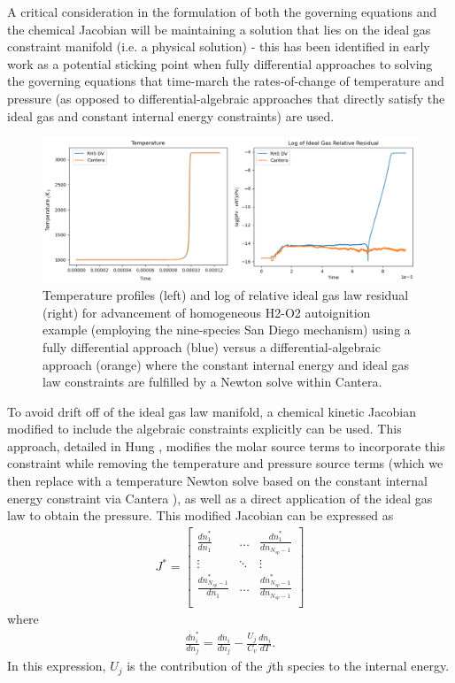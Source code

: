 A critical consideration in the formulation of both the governing equations
and the chemical Jacobian will be maintaining a solution
that lies on the ideal gas constraint manifold (i.e. a physical solution) - this
has been identified in early work as a potential sticking point when fully
differential approaches to solving the governing equations that time-march
the rates-of-change of temperature and pressure (as opposed to
differential-algebraic approaches that directly satisfy the ideal gas and
constant internal energy constraints) are used.
\begin{figure}
\centering
\includegraphics[width=0.8\linewidth,trim=4 4 4 4,clip]{figures/autoignition_drift.png}
	\caption{Temperature profiles (left) and log of relative ideal gas law residual (right)
		 for advancement of homogeneous H2-O2 autoignition example (employing the nine-species
		 San Diego mechanism) using a fully differential approach (blue) versus a differential-algebraic
		 approach (orange) where the constant internal energy and ideal gas law constraints are fulfilled
		 by a Newton solve within Cantera.}
\label{fig:autoignition_drift}
\end{figure}
To avoid drift off of the ideal gas law manifold, a chemical
kinetic Jacobian modified to include the algebraic constraints explicitly can
be used. This approach, detailed in Hung \cite{hung2003algorithms}, modifies the molar source terms to incorporate
this constraint while removing the temperature and pressure source terms (which
we then replace with a temperature Newton solve based on the constant internal
energy constraint via Cantera \cite{cantera}), as well as a direct application of the ideal
gas law to obtain the pressure. This modified Jacobian can be expressed as
\begin{align}
J^{*} = \begin{bmatrix}	\frac{d\dot{n}_{1}^{*}}{dn_{1}} & \hdots & \frac{d\dot{n}_{1}^{*}}{dn_{N_{sp}-1}} \\
	                \vdots & \ddots & \vdots \\
	                \frac{d\dot{n}_{N_{sp}-1}^{*}}{dn_{1}} & \hdots & \frac{d\dot{n}_{N_{sp}-1}^{*}}{dn_{N_{sp}-1}} \\
    \end{bmatrix}
\end{align}
where
\begin{align}
\frac{d\dot{n}_{i}^{*}}{dn_{j}} = \frac{d\dot{n}_{i}}{dn_{j}} - \frac{U_{j}}{C_{v}}\frac{d\dot{n}_{i}}{dT}.
\end{align}
In this expression, $U_{j}$ is the contribution of the $j$th species to the
internal energy.

